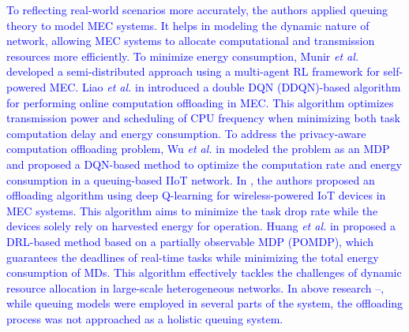 \documentclass[10pt, journal,letterpaper]{IEEEtran}
\begin{document}
  \textcolor{blue}{To reflecting real-world scenarios more accurately, the authors applied queuing theory to model MEC systems. It helps in modeling the dynamic nature of network, allowing MEC systems to allocate computational and transmission resources more efficiently.
 	To minimize energy consumption, Munir \textit{et al.} \cite{munir2021multi} developed a semi-distributed approach using a multi-agent RL framework for self-powered MEC. 
 	Liao \textit{et al.} in \cite{liao2023online} introduced a double DQN (DDQN)-based algorithm for performing online computation offloading in MEC. This algorithm optimizes transmission power and scheduling of CPU frequency when minimizing both task computation delay and energy consumption. 
To address the privacy-aware computation offloading problem, Wu \textit{et al.} in \cite{wu2024combining} modeled the problem as an MDP and proposed a DQN-based method to optimize the computation rate and energy consumption in a queuing-based IIoT network.
	In \cite{Bolourian-WCL24}, the authors proposed an offloading algorithm using deep Q-learning for wireless-powered IoT devices in MEC systems. This algorithm aims to minimize the task drop rate while the devices solely rely on harvested energy for operation. 
	 Huang \textit{et al.} in \cite{huang2021deadline} proposed a DRL-based method based on a partially observable MDP (POMDP), which guarantees the deadlines of real-time tasks while minimizing the total energy consumption of MDs. This algorithm effectively tackles the challenges of dynamic resource allocation in large-scale heterogeneous networks.
	 In above research \cite{munir2021multi}--\cite{huang2021deadline}, while queuing models were employed in several parts of the system, the offloading process was not approached as a holistic queuing system. }
	 

	 
\end{document}
